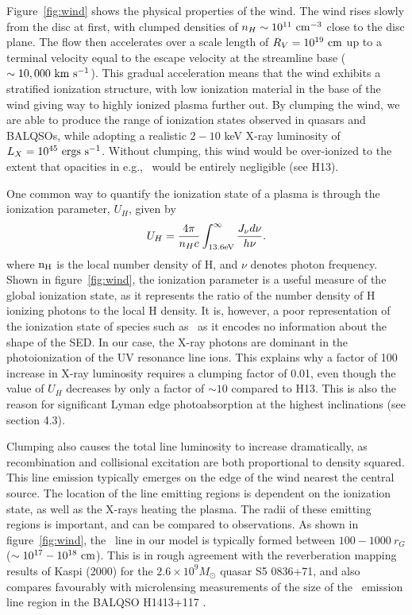 \documentclass[useAMS,usenatbib]{mn2e_x}
\begin{document}
Figure~\ref{fig:wind} shows the physical properties of the wind.
The wind rises slowly from the disc at first, with clumped densities
of $n_H \sim 10^{11}~\rm{cm^{-3}}$ close to the disc plane.
The flow then accelerates over a scale length of $R_V=10^{19}~\rm{cm}$
up to a terminal velocity equal to the escape velocity at the streamline base
($\sim10,000~\rm{km~s^{-1}}$). This gradual acceleration means that
the wind exhibits a stratified ionization structure, with low ionization material
in the base of the wind giving way to highly ionized plasma further out.
By clumping the wind, we are able to produce the range of ionization states observed
in quasars and BALQSOs, while adopting a realistic $2-10$ keV X-ray luminosity
of $L_{X}=10^{45}~\rm{ergs~s^{-1}}$. Without clumping, this wind would be over-ionized 
to the extent that opacities in e.g., \civ\ would be entirely negligible (see H13).

One common way to quantify the ionization state of a plasma
is through the ionization parameter, $U_H$, given by
\begin{equation}
U_H = \frac{4\pi}{n_H c}\int_{13.6{\rm{eV}}}^{\infty}\frac{{J_{\nu}d\nu}}{h\nu}.
\end{equation}
\noindent where $\rm{n_H}$ is the local number density of H, and $\nu$ denotes photon 
frequency. Shown in figure~\ref{fig:wind},
the ionization parameter is a useful measure of the global ionization state,
as it represents the ratio of the number density of 
H ionizing photons to the local H density.
It is, however, a poor representation of the 
ionization state of species such as \civ\ as it encodes no information
about the shape of the SED. In our case, the X-ray photons 
are dominant in the photoionization of the UV resonance line ions. 
This explains why a factor of 100 increase in X-ray luminosity requires
a clumping factor of 0.01, even though the value of $U_H$ decreases by only a factor of $\sim10$ 
compared to H13. This is also the reason for significant Lyman edge photoabsorption
at the highest inclinations (see section 4.3).

Clumping also causes the total line luminosity to increase dramatically,
as recombination and collisional excitation are both proportional to
density squared. This line emission typically emerges on the edge of the wind
nearest the central source. The location of the line emitting regions
is dependent on the ionization state, as well as the X-rays heating the plasma.
The radii of these emitting regions is important,
and can be compared to observations. As shown in figure~\ref{fig:wind},
the \civ\ line in our model is typically formed between 
$100-1000~r_G$ ($\sim10^{17}-10^{18}~\rm{cm}$).
This is in rough agreement with the reverberation mapping 
results of Kaspi (2000) for the $2.6\times10^{9} M_\odot$ quasar S5 0836+71,
and also compares favourably with microlensing measurements of the size of the
\civ\ emission line region in the BALQSO H1413+117 \citep{odowd2015}.
\end{document}
